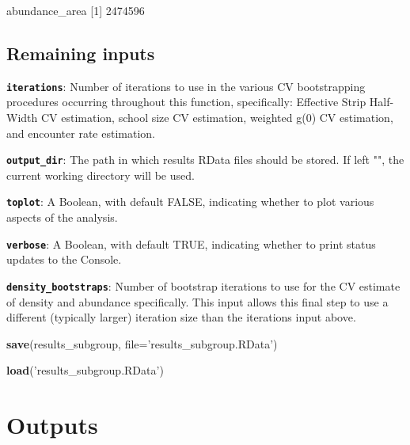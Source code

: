 \documentclass[
]{book}
\newenvironment{Shaded}{\begin{snugshade}}{\end{snugshade}}
\newcommand{\DataTypeTok}[1]{\textcolor[rgb]{0.13,0.29,0.53}{#1}}
\newcommand{\DecValTok}[1]{\textcolor[rgb]{0.00,0.00,0.81}{#1}}
\newcommand{\KeywordTok}[1]{\textcolor[rgb]{0.13,0.29,0.53}{\textbf{#1}}}
\newcommand{\NormalTok}[1]{#1}
\newcommand{\StringTok}[1]{\textcolor[rgb]{0.31,0.60,0.02}{#1}}
\begin{document}
\begin{Shaded}
\begin{Highlighting}[]

\NormalTok{abundance_area}
\NormalTok{[}\DecValTok{1}\NormalTok{] }\DecValTok{2474596}
\end{Highlighting}
\end{Shaded}

\hypertarget{remaining-inputs}{%
\subsection*{Remaining inputs}\label{remaining-inputs}}

\textbf{\texttt{iterations}}: Number of iterations to use in the various CV bootstrapping procedures occurring throughout this function, specifically: Effective Strip Half-Width CV estimation, school size CV estimation, weighted g(0) CV estimation, and encounter rate estimation.

\textbf{\texttt{output\_dir}}: The path in which results RData files should be stored. If left "", the current working directory will be used.

\textbf{\texttt{toplot}}: A Boolean, with default FALSE, indicating whether to plot various aspects of the analysis.

\textbf{\texttt{verbose}}: A Boolean, with default TRUE, indicating whether to print status updates to the Console.

\textbf{\texttt{density\_bootstraps}}: Number of bootstrap iterations to use for the CV estimate of density and abundance specifically. This input allows this final step to use a different (typically larger) iteration size than the iterations input above.

\begin{Shaded}
\begin{Highlighting}[]
\KeywordTok{save}\NormalTok{(results_subgroup, }\DataTypeTok{file=}\StringTok{'results_subgroup.RData'}\NormalTok{)}
\end{Highlighting}
\end{Shaded}

\begin{Shaded}
\begin{Highlighting}[]
\KeywordTok{load}\NormalTok{(}\StringTok{'results_subgroup.RData'}\NormalTok{)}
\end{Highlighting}
\end{Shaded}

\hypertarget{outputs-1}{%
\section*{Outputs}\label{outputs-1}}
\end{document}
